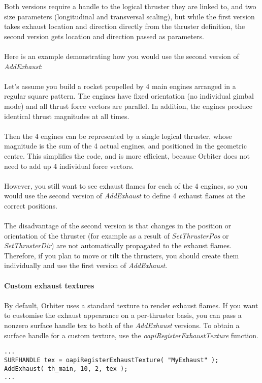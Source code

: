 \documentclass[Orbiter Developer Manual.tex]{subfiles}
\begin{document}
\noindent
Both versions require a handle to the logical thruster they are linked to, and two size parameters (longitudinal and transversal scaling), but while the first version takes exhaust location and direction directly from the thruster definition, the second version gets location and direction passed as parameters.\\
\\
Here is an example demonstrating how you would use the second version of \textit{AddExhaust}:\\
\\
Let’s assume you build a rocket propelled by 4 main engines arranged in a regular square pattern. The engines have fixed orientation (no individual gimbal mode) and all thrust force vectors are parallel. In addition, the engines produce identical thrust magnitudes at all times.\\
\\
Then the 4 engines can be represented by a single logical thruster, whose magnitude is the sum of the 4 actual engines, and positioned in the geometric centre. This simplifies the code, and is more efficient, because Orbiter does not need to add up 4 individual force vectors.\\
\\
However, you still want to see exhaust flames for each of the 4 engines, so you would use the second version of \textit{AddExhaust} to define 4 exhaust flames at the correct positions.\\
\\
The disadvantage of the second version is that changes in the position or orientation of the thruster (for example as a result of \textit{SetThrusterPos} or \textit{SetThrusterDir}) are not automatically propagated to the exhaust flames. Therefore, if you plan to move or tilt the thrusters, you should create them individually and use the first version of \textit{AddExhaust}.\\
\\
\textbf{Custom exhaust textures}\\
\\
By default, Orbiter uses a standard texture to render exhaust flames. If you want to customise the exhaust appearance on a per-thruster basis, you can pass a nonzero surface handle tex to both of the \textit{AddExhaust} versions. To obtain a surface handle for a custom texture, use the \textit{oapiRegisterExhaustTexture} function.

\begin{lstlisting}
...
SURFHANDLE tex = oapiRegisterExhaustTexture( "MyExhaust" );
AddExhaust( th_main, 10, 2, tex );
...
\end{lstlisting}
\end{document}

